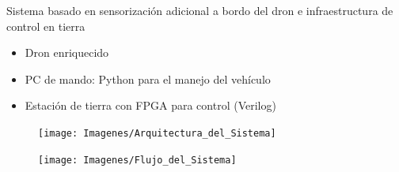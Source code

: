 \documentclass[a4,landscpae]{seminar}
\begin{document}
\begin{hslide}
Sistema basado en sensorizaci\'on adicional a bordo del dron e infraestructura de control en tierra\\

\begin{minipage}{4.8cm}
	\begin{itemize}
		\item Dron enriquecido
	\end{itemize}
	\begin{itemize}
		\item PC de mando: Python para el manejo del veh\'iculo
		\item Estaci\'on de tierra con FPGA para control (Verilog)
	\end{itemize}
\end{minipage} \hfill
\begin{minipage}{8cm}
	\begin{figure}
		\texttt{[image: Imagenes/Arquitectura\_del\_Sistema]}
	\end{figure}
\end{minipage} \hfill
\end{hslide}
\begin{hslide}
\begin{center}
	\begin{figure}[h]
		\texttt{[image: Imagenes/Flujo\_del\_Sistema]}
	\end{figure}
\end{center}
\end{hslide}
\end{document}
